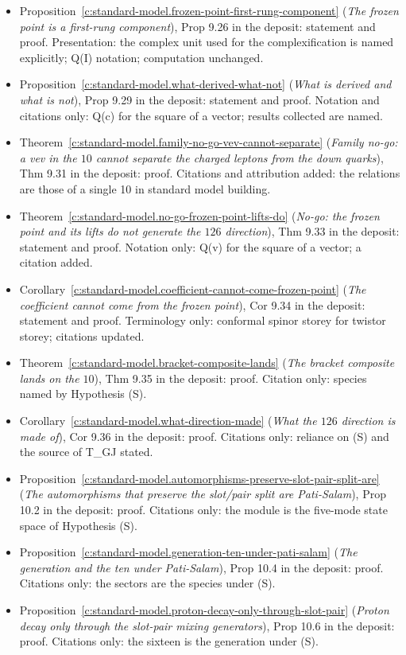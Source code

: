 \documentclass[11pt]{article}
\theoremstyle{definition}
\theoremstyle{plain}
\begin{document}
\begin{itemize}
\item Proposition~\ref{c:standard-model.frozen-point-first-rung-component} (\emph{The frozen point is a first-rung component}), Prop 9.26 in the deposit: statement and proof. Presentation: the complex unit used for the complexification is named explicitly; Q(I) notation; computation unchanged.
\item Proposition~\ref{c:standard-model.what-derived-what-not} (\emph{What is derived and what is not}), Prop 9.29 in the deposit: statement and proof. Notation and citations only: Q(c) for the square of a vector; results collected are named.
\item Theorem~\ref{c:standard-model.family-no-go-vev-cannot-separate} (\emph{Family no-go: a vev in the $10$ cannot separate the charged leptons from the down quarks}), Thm 9.31 in the deposit: proof. Citations and attribution added: the relations are those of a single 10 in standard model building.
\item Theorem~\ref{c:standard-model.no-go-frozen-point-lifts-do} (\emph{No-go: the frozen point and its lifts do not generate the $126$ direction}), Thm 9.33 in the deposit: statement and proof. Notation only: Q(v) for the square of a vector; a citation added.
\item Corollary~\ref{c:standard-model.coefficient-cannot-come-frozen-point} (\emph{The coefficient cannot come from the frozen point}), Cor 9.34 in the deposit: statement and proof. Terminology only: conformal spinor storey for twistor storey; citations updated.
\item Theorem~\ref{c:standard-model.bracket-composite-lands} (\emph{The bracket composite lands on the $10$}), Thm 9.35 in the deposit: proof. Citation only: species named by Hypothesis (S).
\item Corollary~\ref{c:standard-model.what-direction-made} (\emph{What the $126$ direction is made of}), Cor 9.36 in the deposit: proof. Citations only: reliance on (S) and the source of T\_GJ stated.
\item Proposition~\ref{c:standard-model.automorphisms-preserve-slot-pair-split-are} (\emph{The automorphisms that preserve the slot/pair split are Pati-Salam}), Prop 10.2 in the deposit: proof. Citations only: the module is the five-mode state space of Hypothesis (S).
\item Proposition~\ref{c:standard-model.generation-ten-under-pati-salam} (\emph{The generation and the ten under Pati-Salam}), Prop 10.4 in the deposit: proof. Citations only: the sectors are the species under (S).
\item Proposition~\ref{c:standard-model.proton-decay-only-through-slot-pair} (\emph{Proton decay only through the slot-pair mixing generators}), Prop 10.6 in the deposit: proof. Citations only: the sixteen is the generation under (S).

\end{itemize}
\end{document}

